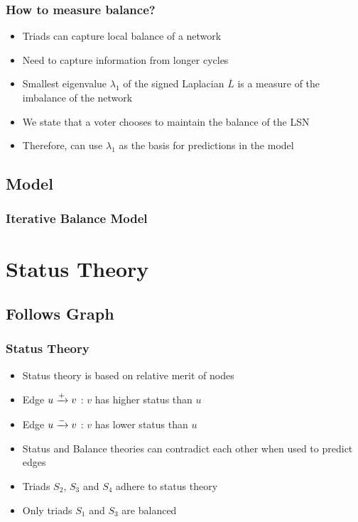 \documentclass{beamer}
\begin{document}
\begin{frame}
    \frametitle{How to measure balance?}
    \begin{itemize}
        \item Triads can capture local balance of a network
        \item Need to capture information from longer cycles \cite{chiang2011exploiting}
        \item Smallest eigenvalue $\lambda_{1}$ of the signed Laplacian $\overline{L}$ is a measure of the imbalance of the network \cite{hou2005bounds}
        \item  We state that a voter chooses to maintain the balance of the LSN
        \item Therefore, can use $\lambda_{1}$ as the basis for predictions in the model
    \end{itemize}
    

\end{frame}
\subsection{Model}
\begin{frame}
    \frametitle{Iterative Balance Model}
    \centering
    \scalebox{0.7}{}

\end{frame}

\section{Status Theory}


\subsection{Follows Graph}

\begin{frame}
    \frametitle{Status Theory}
    \begin{itemize}
        \item Status theory is based on relative merit of nodes
        \item Edge $u\xrightarrow{+} v$ : $v$ has higher status than $u$
        \item Edge $u \xrightarrow{-} v$ : $v$ has lower status than $u$
        \item Status and Balance theories can contradict each other when used to predict edges
        \item Triads $S_2$, $S_3$ and $S_4$ adhere to status theory
        \item Only triads $S_1$ and $S_3$ are balanced 
    \end{itemize}
    \begin{figure}
        \centering
        \scalebox{0.7}{}
    \end{figure}

\end{frame}
\end{document}
